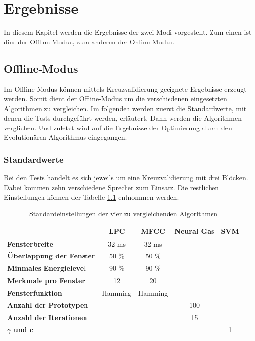 \chapter{Ergebnisse}
In diesem Kapitel werden die Ergebnisse der zwei Modi vorgestellt. Zum einen ist dies der Offline-Modus, zum anderen der Online-Modus. 

\section{Offline-Modus}
Im Offline-Modus können mittels Kreuzvalidierung geeignete Ergebnisse erzeugt werden. Somit dient der Offline-Modus um die verschiedenen eingesetzten Algorithmen zu vergleichen. Im folgenden werden zuerst die Standardwerte, mit denen die Tests durchgeführt werden, erläutert. Dann werden die Algorithmen verglichen. Und zuletzt wird auf die Ergebnisse der Optimierung durch den Evolutionären Algorithmus eingegangen.

\subsection{Standardwerte}
Bei den Tests handelt es sich jeweils um eine Kreuzvalidierung mit drei Blöcken. Dabei kommen zehn verschiedene Sprecher zum Einsatz. Die restlichen Einstellungen können der Tabelle \ref{tbl:standardwerte} entnommen werden.

\setlength{\tabcolsep}{10pt} %
\renewcommand{\arraystretch}{1.25} %

\begin{table}[h]
	\centering
	\label{tbl:standardwerte}
	\begin{tabular}{l|c|c|c|c}			
		& \textbf{LPC} & \textbf{MFCC} & \textbf{Neural Gas} & \textbf{SVM} \\
		\hline
		\textbf{Fensterbreite} & 32 ms & 32 ms & & \\
		\textbf{Überlappung der Fenster} & 50 \% & 50 \% & & \\
		\textbf{Minmales Energielevel} & 90 \% & 90 \% & & \\
		\textbf{Merkmale pro Fenster} & 12 & 20 & & \\
		\textbf{Fensterfunktion} & Hamming & Hamming & & \\
		\textbf{Anzahl der Prototypen} & & & 100 & \\
		\textbf{Anzahl der Iterationen} & & & 15 & \\
		\textbf{$\gamma$ und c} & & & & 1 \\
	\end{tabular}
	\caption{Standardeinstellungen der vier zu vergleichenden Algorithmen}
\end{table}

